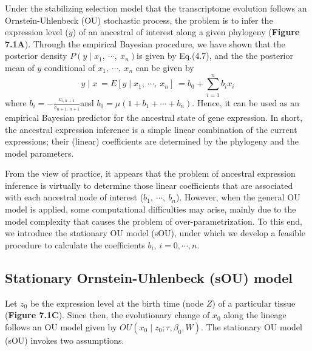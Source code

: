 \documentclass[]{book}
\begin{document}
Under the stabilizing selection model that the transcriptome evolution follows an Ornstein-Uhlenbeck (OU) stochastic process, the problem is to infer the expression level (\(y\)) of an ancestral of interest along a given phylogeny (\textbf{Figure 7.1A}). Through the empirical Bayesian procedure, we have shown that the posterior density \(P\left(y\mid x_1,\  \cdots,\  x_n\right)\)is given by Eq.(4.7), and the the posterior mean of \(y\) conditional of \(x_1,\  \cdots,\  x_n\) can be given by
\[y\mid x\  =E\left[y\mid x_1,\  \cdots,\  x_n\right]\  =b_0+\sum_{i=1}^nb_ix_i\tag{4.8}\]
where \(b_i=-\frac{c_{i,n+1}}{c_{n+1,\  n+1}}\)and \(b_0=\mu\left(1+b_1+\cdots+b_n\right)\). Hence, it can be used as an empirical Bayesian predictor for the ancestral state of gene expression. In short, the ancestral expression inference is a simple linear combination of the current expressions; their (linear) coefficients are determined by the phylogeny and the model parameters.

From the view of practice, it appears that the problem of ancestral expression inference is virtually to determine those linear coefficients that are associated with each ancestral node of interest (\(b_1,\  \cdots,\  b_n\)). However, when the general OU model is applied, some computational difficulties may arise, mainly due to the model complexity that causes the problem of over-parametrization. To this end, we introduce the stationary OU model (sOU), under which we develop a feasible procedure to calculate the coefficients \(b_i\), \(i=0,\cdots,n\).

\hypertarget{stationary-ornstein-uhlenbeck-sou-model}{%
\subsection{Stationary Ornstein-Uhlenbeck (sOU) model}\label{stationary-ornstein-uhlenbeck-sou-model}}

Let \(z_0\) be the expression level at the birth time (node \(Z\)) of a particular tissue (\textbf{Figure 7.1C}). Since then, the evolutionary change of \(x_0\) along the lineage follows an OU model given by \(OU\left(x_0\mid z_0; \tau,\beta_0, W\right)\). The stationary OU model (sOU) invokes two assumptions.
\end{document}
